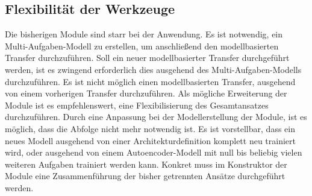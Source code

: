 	\subsection{Flexibilität der Werkzeuge}
	\label{subsec:FlexibilitätDerWerkzeuge}
	Die bisherigen Module sind starr bei der Anwendung. Es ist notwendig, ein Multi-Aufgaben-Modell zu erstellen, um anschließend den modellbasierten Transfer durchzuführen. Soll ein neuer modellbasierter Transfer durchgeführt werden, ist es zwingend erforderlich dies ausgehend des Multi-Aufgaben-Modells durchzuführen. Es ist nicht möglich einen modellbasierten Transfer, ausgehend von einem vorherigen Transfer durchzuführen. 
	Als mögliche Erweiterung der Module ist es empfehlenswert, eine Flexibilisierung des Gesamtansatzes durchzuführen. Durch eine Anpassung bei der Modellerstellung der Module, ist es möglich, dass die Abfolge nicht mehr notwendig ist. Es ist vorstellbar, dass ein neues Modell ausgehend von einer Architekturdefinition komplett neu trainiert wird, oder ausgehend von einem Autoencoder-Modell mit null bis beliebig vielen weiteren Aufgaben trainiert werden kann. Konkret muss im Konstruktor der Module eine Zusammenführung der bisher getrennten Ansätze durchgeführt werden.     


	   